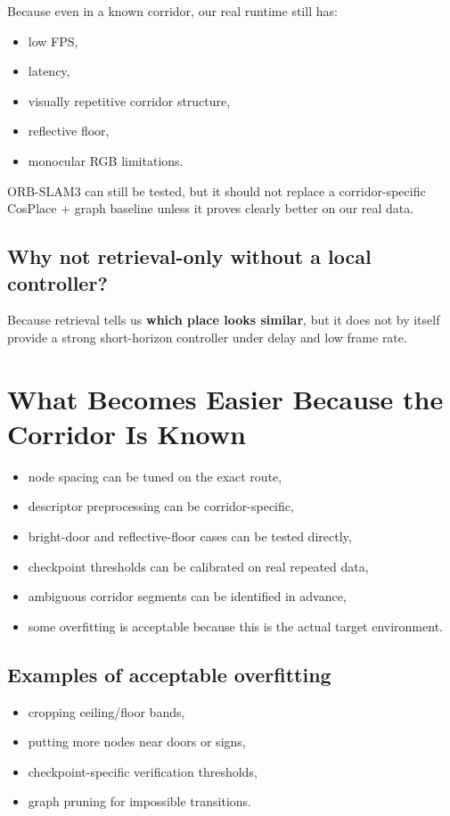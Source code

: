 \documentclass[11pt,a4paper]{article}
\begin{document}
Because even in a known corridor, our real runtime still has:

\begin{itemize}[nosep]
  \item low FPS,
  \item latency,
  \item visually repetitive corridor structure,
  \item reflective floor,
  \item monocular RGB limitations.
\end{itemize}

ORB-SLAM3 can still be tested, but it should not replace a corridor-specific
CosPlace + graph baseline unless it proves clearly better on our real data.

\subsection*{Why not retrieval-only without a local controller?}

Because retrieval tells us \textbf{which place looks similar}, but it does not
by itself provide a strong short-horizon controller under delay and low frame rate.


\section{What Becomes Easier Because the Corridor Is Known}

\begin{itemize}[nosep]
  \item node spacing can be tuned on the exact route,
  \item descriptor preprocessing can be corridor-specific,
  \item bright-door and reflective-floor cases can be tested directly,
  \item checkpoint thresholds can be calibrated on real repeated data,
  \item ambiguous corridor segments can be identified in advance,
  \item some overfitting is acceptable because this is the actual target environment.
\end{itemize}

\subsection*{Examples of acceptable overfitting}

\begin{itemize}[nosep]
  \item cropping ceiling/floor bands,
  \item putting more nodes near doors or signs,
  \item checkpoint-specific verification thresholds,
  \item graph pruning for impossible transitions.
\end{itemize}
\end{document}
